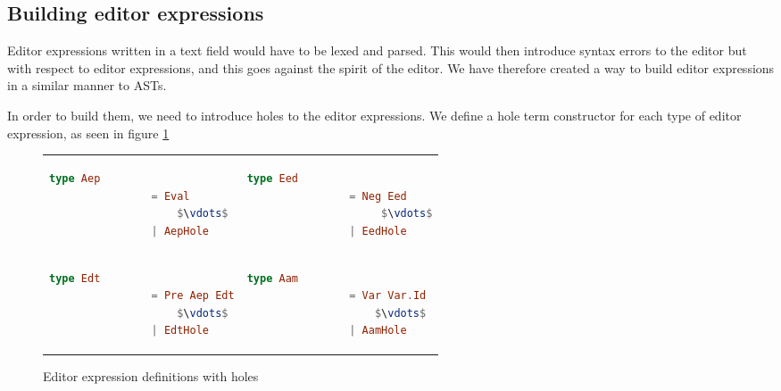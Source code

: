 \subsection{Building editor expressions}

Editor expressions written in a text field would have to be lexed and
parsed.  This would then introduce syntax errors to the editor but
with respect to editor expressions, and this goes against the spirit
of the editor. We have therefore created a way to build editor
expressions in a similar manner to ASTs.

In order to build them, we need to introduce holes to the editor
expressions. We define a hole term constructor for each type of editor
expression, as seen in figure \ref{fig:editorexpressionswithholes}

\begin{figure}[H]
  \hspace{-6mm}
    \begin{tabular}{p{3.9cm}p{3.9cm}}
        \begin{lstlisting}[language=elm,%
                            gobble=8,%
                            mathescape,%
                            ]
             type Aep
                = Eval
                    $\vdots$
                | AepHole
        \end{lstlisting} &

    \begin{lstlisting}[language=elm,%
                            gobble=8,%
                            mathescape,%
                            ]
            type Eed
                = Neg Eed
                     $\vdots$
                | EedHole
        \end{lstlisting} \\

    \begin{lstlisting}[language=elm,%
                            gobble=8,%
                            mathescape,%
                            ]
            type Edt
                = Pre Aep Edt
                    $\vdots$
                | EdtHole
        \end{lstlisting} &

    \begin{lstlisting}[language=elm,%
                            gobble=8,%
                            mathescape,%
                            ]
            type Aam
                = Var Var.Id
                    $\vdots$
                | AamHole
        \end{lstlisting}
  \end{tabular}
  \caption{Editor expression definitions with holes}
  \label{fig:editorexpressionswithholes}
\end{figure}

